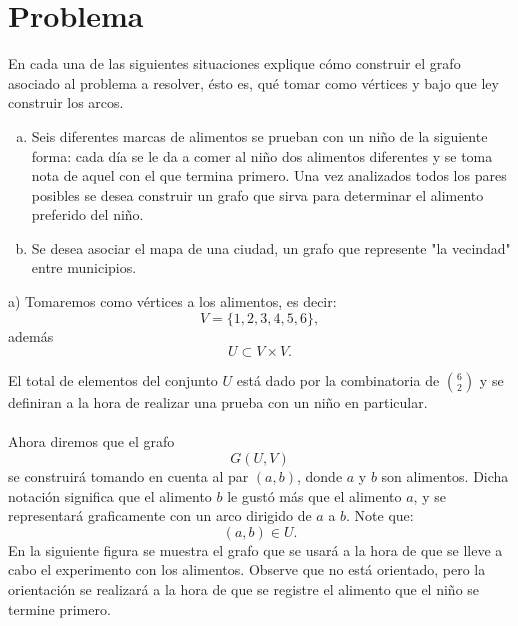 \documentclass[autocontact]{gaceta}
\begin{document}
\section{Problema}
    En cada una de las siguientes situaciones explique cómo construir el grafo asociado al
    problema a resolver, ésto es, qué tomar como vértices y bajo que ley construir los 
    arcos.
    \begin{enumerate}[a)]
        \item Seis diferentes marcas de alimentos se prueban con un niño de la siguiente 
            forma: cada día se le da a comer al niño dos alimentos diferentes y se toma nota
            de aquel con el que termina primero. Una vez analizados todos los pares posibles
            se desea construir un grafo que sirva para determinar el alimento preferido del 
            niño.
        \item Se desea asociar el mapa de una ciudad, un grafo que represente "la vecindad"
            entre municipios.
    \end{enumerate}

    a) Tomaremos como vértices a los alimentos, es decir:\\
    \begin{equation}
        V = \{1,2,3,4,5,6\},
    \end{equation}
    además
    \begin{equation}
        U \subset V \times V.
    \end{equation}

    El total de elementos del conjunto $U$ está dado por la combinatoria de ${6 \choose 2}$ y
    se definiran a la hora de realizar una prueba con un niño en particular.\\
    \\Ahora diremos que el grafo
    \begin{equation}
        G(U,V)
    \end{equation}
    se construirá tomando en cuenta al par $(a, b)$, donde $a$ y $b$ son alimentos. Dicha
    notación significa que el alimento $b$ le gustó más que el alimento $a$, y se representará
    graficamente con un arco dirigido de $a$ a $b$. Note que:
    \begin{equation}
        (a,b) \in U.
    \end{equation}
    En la siguiente figura se muestra el grafo que se usará a la hora de que se lleve a cabo 
    el experimento con los alimentos. Observe que no está orientado, pero la orientación 
    se realizará a la hora de que se registre el alimento que el niño se termine primero.
\end{document}
